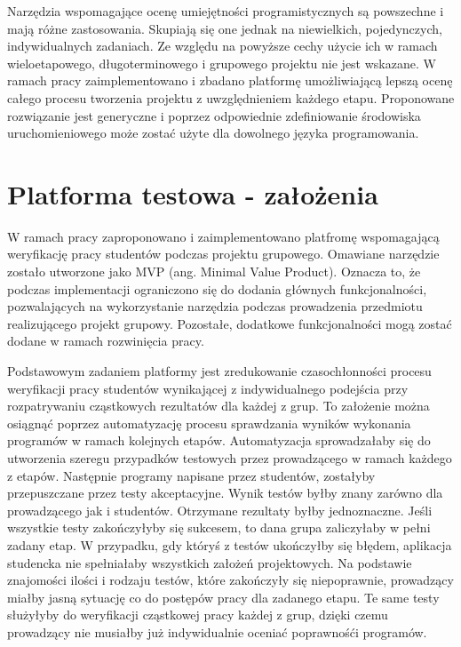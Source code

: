 Narzędzia wspomagające ocenę umiejętności programistycznych są powszechne i mają różne zastosowania.
Skupiają się one jednak na niewielkich, pojedynczych, indywidualnych zadaniach.
Ze względu na powyższe cechy użycie ich w ramach wieloetapowego, długoterminowego i grupowego projektu nie jest wskazane.
W ramach pracy zaimplementowano i zbadano platformę umożliwiającą lepszą ocenę całego procesu tworzenia projektu z uwzględnieniem każdego etapu.
Proponowane rozwiązanie jest generyczne i poprzez odpowiednie zdefiniowanie środowiska uruchomieniowego może zostać użyte dla dowolnego języka programowania.




\section{Platforma testowa - założenia}

W ramach pracy zaproponowano i zaimplementowano platfromę wspomagającą weryfikację pracy studentów podczas projektu grupowego. 
Omawiane narzędzie zostało utworzone jako MVP (ang. Minimal Value Product). 
Oznacza to, że podczas implementacji ograniczono się do dodania głównych funkcjonalności, pozwalających na wykorzystanie narzędzia podczas prowadzenia przedmiotu realizującego projekt grupowy.
Pozostałe, dodatkowe funkcjonalności mogą zostać dodane w ramach rozwinięcia pracy.

Podstawowym zadaniem platformy jest zredukowanie czasochłonności procesu weryfikacji pracy studentów wynikającej z indywidualnego podejścia przy rozpatrywaniu cząstkowych rezultatów dla każdej z grup.
To założenie można osiągnąć poprzez automatyzację procesu sprawdzania wyników wykonania programów w ramach kolejnych etapów.
Automatyzacja sprowadzałaby się do utworzenia szeregu przypadków testowych przez prowadzącego w ramach każdego z etapów.
Następnie programy napisane przez studentów, zostałyby przepuszczane przez testy akceptacyjne.
Wynik testów byłby znany zarówno dla prowadzącego jak i studentów.
Otrzymane rezultaty byłby jednoznaczne.
Jeśli wszystkie testy zakończyłyby się sukcesem, to dana grupa zaliczyłaby w pełni zadany etap.
W przypadku, gdy któryś z testów ukończyłby się błędem, aplikacja studencka nie spełniałaby wszystkich założeń projektowych.
Na podstawie znajomości ilości i rodzaju testów, które zakończyły się niepoprawnie, prowadzący miałby jasną sytuację co do postępów pracy dla zadanego etapu.
Te same testy służyłyby do weryfikacji cząstkowej pracy każdej z grup, dzięki czemu prowadzący nie musiałby już indywidualnie oceniać poprawnośći programów.

